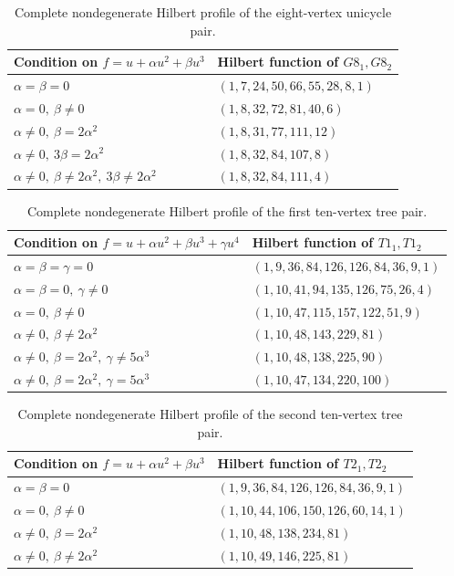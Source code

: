 \documentclass[reqno]{article}
\theoremstyle{plain} %
\theoremstyle{definition}
\theoremstyle{remark}
\numberwithin{equation}{section}
\begin{document}
\begin{table}[htbp]
\centering\renewcommand{\arraystretch}{1.17}
\begin{tabular}{ll}\toprule
Condition on $f=u+\alpha u^2+\beta u^3$&Hilbert function of $G8_1,G8_2$\\\midrule
$\alpha=\beta=0$&$(1,7,24,50,66,55,28,8,1)$\\
$\alpha=0,\ \beta\ne0$&$(1,8,32,72,81,40,6)$\\
$\alpha\ne0,\ \beta=2\alpha^2$&$(1,8,31,77,111,12)$\\
$\alpha\ne0,\ 3\beta=2\alpha^2$&$(1,8,32,84,107,8)$\\
$\alpha\ne0,\ \beta\ne2\alpha^2,\ 3\beta\ne2\alpha^2$
 &$(1,8,32,84,111,4)$\\\bottomrule
\end{tabular}
\caption{Complete nondegenerate Hilbert profile of the eight-vertex unicycle pair.}
\label{tab:profile-G8}
\end{table}

\begin{table}[htbp]
\centering\renewcommand{\arraystretch}{1.17}
\begin{tabular}{ll}\toprule
Condition on $f=u+\alpha u^2+\beta u^3+\gamma u^4$&Hilbert function of $T1_1,T1_2$\\\midrule
$\alpha=\beta=\gamma=0$&$(1,9,36,84,126,126,84,36,9,1)$\\
$\alpha=\beta=0,\ \gamma\ne0$&$(1,10,41,94,135,126,75,26,4)$\\
$\alpha=0,\ \beta\ne0$&$(1,10,47,115,157,122,51,9)$\\
$\alpha\ne0,\ \beta\ne2\alpha^2$&$(1,10,48,143,229,81)$\\
$\alpha\ne0,\ \beta=2\alpha^2,\ \gamma\ne5\alpha^3$&$(1,10,48,138,225,90)$\\
$\alpha\ne0,\ \beta=2\alpha^2,\ \gamma=5\alpha^3$&$(1,10,47,134,220,100)$\\\bottomrule
\end{tabular}
\caption{Complete nondegenerate Hilbert profile of the first ten-vertex tree pair.}
\label{tab:profile-T1}
\end{table}

\begin{table}[htbp]
\centering\renewcommand{\arraystretch}{1.17}
\begin{tabular}{ll}\toprule
Condition on $f=u+\alpha u^2+\beta u^3$&Hilbert function of $T2_1,T2_2$\\\midrule
$\alpha=\beta=0$&$(1,9,36,84,126,126,84,36,9,1)$\\
$\alpha=0,\ \beta\ne0$&$(1,10,44,106,150,126,60,14,1)$\\
$\alpha\ne0,\ \beta=2\alpha^2$&$(1,10,48,138,234,81)$\\
$\alpha\ne0,\ \beta\ne2\alpha^2$&$(1,10,49,146,225,81)$\\\bottomrule
\end{tabular}
\caption{Complete nondegenerate Hilbert profile of the second ten-vertex tree pair.}
\label{tab:profile-T2}
\end{table}
\end{document}
